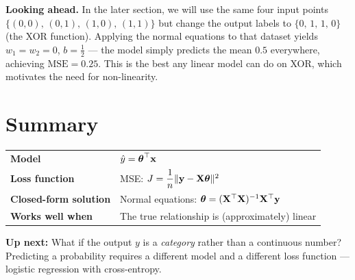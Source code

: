 \documentclass[12pt, a4paper]{article}
\begin{document}
\begin{notebox}
  \textbf{Looking ahead.}
  In the later section, we will use the same four input points
  $\{(0,0),\,(0,1),\,(1,0),\,(1,1)\}$ but change the output labels to
  $\{0,\,1,\,1,\,0\}$ (the XOR function). Applying the normal equations to
  that dataset yields $w_1 = w_2 = 0$, $b = \tfrac{1}{2}$ — the model simply
  predicts the mean $0.5$ everywhere, achieving $\mathrm{MSE} = 0.25$.
  This is the best any linear model can do on XOR, which motivates the
  need for non-linearity.

\end{notebox}

\section{Summary}

\begin{center}
  \renewcommand{\arraystretch}{1.5}
  \begin{tabular}{ll}
    \toprule
    \textbf{Model}                & $\hat{y} = \boldsymbol{\theta}^{\top}\mathbf{x}$                                     \\
    \textbf{Loss function}        & MSE: $J = \dfrac{1}{n}\|\mathbf{y} - \mathbf{X}\boldsymbol{\theta}\|^2$                   \\
    \textbf{Closed-form solution} & Normal equations: $\boldsymbol{\theta} = (\mathbf{X}^{\top}\mathbf{X})^{-1}\mathbf{X}^{\top}\mathbf{y}$ \\
    \textbf{Works well when}      & The true relationship is (approximately) linear              \\
    \bottomrule
  \end{tabular}
\end{center}

\bigskip
\textbf{Up next:} What if the output $y$ is a \emph{category}
rather than a continuous number? Predicting a probability requires a
different model and a different loss function — logistic regression with
cross-entropy.
\end{document}
